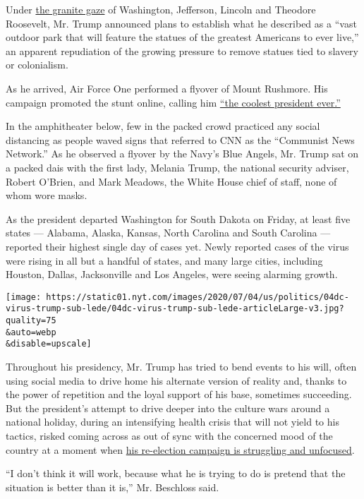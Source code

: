 Under
\href{https://www.nytimes.com/2020/07/01/us/mount-rushmore.html}{the
granite gaze} of Washington, Jefferson, Lincoln and Theodore Roosevelt,
Mr. Trump announced plans to establish what he described as a ``vast
outdoor park that will feature the statues of the greatest Americans to
ever live,'' an apparent repudiation of the growing pressure to remove
statues tied to slavery or colonialism.

As he arrived, Air Force One performed a flyover of Mount Rushmore. His
campaign promoted the stunt online, calling him
\href{https://twitter.com/TeamTrump/status/1279219853790978053}{``the
coolest president ever.''}

In the amphitheater below, few in the packed crowd practiced any social
distancing as people waved signs that referred to CNN as the ``Communist
News Network.'' As he observed a flyover by the Navy's Blue Angels, Mr.
Trump sat on a packed dais with the first lady, Melania Trump, the
national security adviser, Robert O'Brien, and Mark Meadows, the White
House chief of staff, none of whom wore masks.

As the president departed Washington for South Dakota on Friday, at
least five states --- Alabama, Alaska, Kansas, North Carolina and South
Carolina --- reported their highest single day of cases yet. Newly
reported cases of the virus were rising in all but a handful of states,
and many large cities, including Houston, Dallas, Jacksonville and Los
Angeles, were seeing alarming growth.

\texttt{[image: https://static01.nyt.com/images/2020/07/04/us/politics/04dc-virus-trump-sub-lede/04dc-virus-trump-sub-lede-articleLarge-v3.jpg?quality=75\\\&auto=webp\\\&disable=upscale]}

Throughout his presidency, Mr. Trump has tried to bend events to his
will, often using social media to drive home his alternate version of
reality and, thanks to the power of repetition and the loyal support of
his base, sometimes succeeding. But the president's attempt to drive
deeper into the culture wars around a national holiday, during an
intensifying health crisis that will not yield to his tactics, risked
coming across as out of sync with the concerned mood of the country at a
moment when
\href{https://www.nytimes.com/2020/07/02/us/politics/trump-2020-campaign-problems.html}{his
re-election campaign is struggling and unfocused}.

``I don't think it will work, because what he is trying to do is pretend
that the situation is better than it is,'' Mr. Beschloss said.


